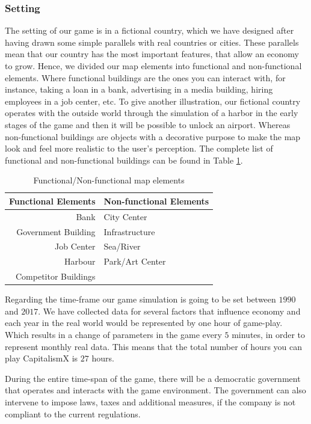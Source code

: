 \documentclass[11pt,titlepage,oneside,openany]{book}
\begin{document}
\subsubsection{Setting}
The setting of our game is in a fictional country, which we have designed after having drawn some simple parallels with real countries or cities. These parallels mean that our country has the most important features, that allow an economy to grow. Hence, we divided our map elements into functional and non-functional elements. Where functional buildings are the ones you can interact with, for instance, taking a loan in a bank, advertising in a media building, hiring employees in a job center, etc.  To give another illustration, our fictional country operates with the outside world through the simulation of a harbor in the early stages of the game and then it will be possible to unlock an airport. Whereas non-functional buildings are objects with a decorative purpose to make the map look and feel  more realistic to the user’s perception. The complete list of functional and non-functional buildings can be found in Table \ref{table:map-el}. 

\begin{table}[ht]
\centering
\begin{tabular}{r|l}
\hline 
 Functional Elements & Non-functional Elements\\
\hline \hline
 Bank & City Center  \\
 Government Building & Infrastructure \\
 Job Center & Sea/River \\
 Harbour & Park/Art Center  \\
 Competitor Buildings & \\
\hline
\end{tabular}
\caption{Functional/Non-functional map elements}
\label{table:map-el}
\end{table}


Regarding the time-frame our game simulation is going to be set between $1990$ and $2017$. We have collected data for several factors that influence economy and each year in the real world would be represented by one hour of game-play. Which results in a change of parameters in the game every $5$ minutes, in order to represent monthly real data. This means that the total number of hours you can play CapitalismX is $27$ hours. %

During the entire time-span of the game, there will be a democratic government that operates and interacts with the game environment. The government can also intervene to impose laws, taxes and additional measures, if the company is not compliant to the current regulations. 
\end{document}
